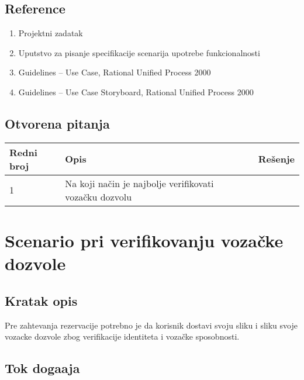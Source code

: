 \documentclass[12pt]{article}
\begin{document}
\subsection{Reference}
\begin{enumerate}
   \item Projektni zadatak
   \item Uputstvo za pisanje specifikacije scenarija upotrebe funkcionalnosti
   \item  Guidelines – Use Case, Rational Unified Process 2000
   \item  Guidelines – Use Case Storyboard, Rational Unified Process 2000
 \end{enumerate}
\subsection{Otvorena pitanja}


\begin{center}
\begin{tabular}{ | m{2cm} | m{7cm}| m{7cm} | } 
\hline
Redni broj& Opis & Rešenje \\ 
\hline
1 & Na koji način je najbolje verifikovati vozačku dozvolu & \\ 
\hline
\end{tabular}
\end{center}

    

\section{Scenario pri verifikovanju vozačke dozvole}
\subsection{Kratak opis}
Pre zahtevanja rezervacije potrebno je da korisnik dostavi svoju sliku i sliku svoje
vozacke dozvole zbog verifikacije identiteta i vozačke sposobnosti.
\subsection{Tok doga\dj aja}
\end{document}
